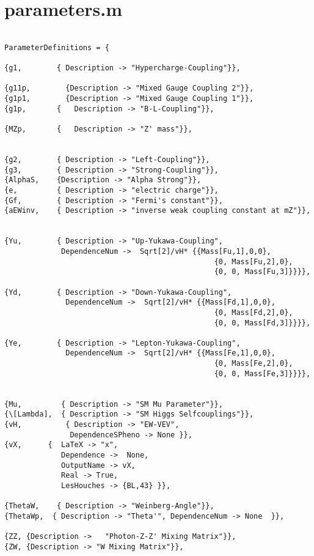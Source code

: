 \section{parameters.m}
\begin{lstlisting}

ParameterDefinitions = { 

{g1,        { Description -> "Hypercharge-Coupling"}},

{g11p,        {Description -> "Mixed Gauge Coupling 2"}},
{g1p1,        {Description -> "Mixed Gauge Coupling 1"}},
{g1p,       {   Description -> "B-L-Coupling"}},

{MZp,       {   Description -> "Z' mass"}},


{g2,        { Description -> "Left-Coupling"}},
{g3,        { Description -> "Strong-Coupling"}},    
{AlphaS,    {Description -> "Alpha Strong"}},	
{e,         { Description -> "electric charge"}},
{Gf,        { Description -> "Fermi's constant"}},
{aEWinv,    { Description -> "inverse weak coupling constant at mZ"}},
 

{Yu,        { Description -> "Up-Yukawa-Coupling",
			 DependenceNum ->  Sqrt[2]/vH* {{Mass[Fu,1],0,0},
             									{0, Mass[Fu,2],0},
             									{0, 0, Mass[Fu,3]}}}}, 
             									
{Yd,        { Description -> "Down-Yukawa-Coupling",
			  DependenceNum ->  Sqrt[2]/vH* {{Mass[Fd,1],0,0},
             									{0, Mass[Fd,2],0},
             									{0, 0, Mass[Fd,3]}}}},
             									
{Ye,        { Description -> "Lepton-Yukawa-Coupling",
			  DependenceNum ->  Sqrt[2]/vH* {{Mass[Fe,1],0,0},
             									{0, Mass[Fe,2],0},
             									{0, 0, Mass[Fe,3]}}}}, 
                                                                            
                                                                           
{Mu,         { Description -> "SM Mu Parameter"}},                                        
{\[Lambda],  { Description -> "SM Higgs Selfcouplings"}},
{vH,          { Description -> "EW-VEV",
               DependenceSPheno -> None }},
{vX,      {  LaTeX -> "x",
             Dependence ->  None, 
             OutputName -> vX,
             Real -> True,
             LesHouches -> {BL,43} }},

{ThetaW,    { Description -> "Weinberg-Angle"}},
{ThetaWp,  { Description -> "Theta'", DependenceNum -> None  }},

{ZZ, {Description ->   "Photon-Z-Z' Mixing Matrix"}},
{ZW, {Description -> "W Mixing Matrix"}},


\end{lstlisting}
